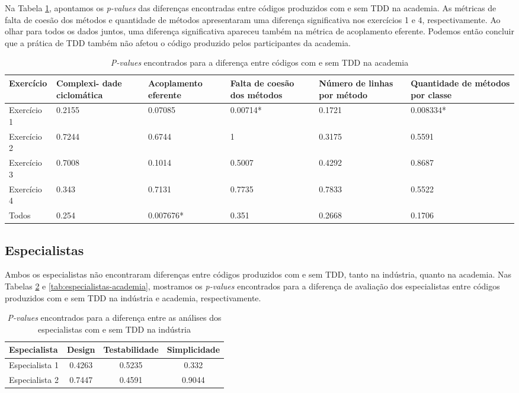 Na Tabela \ref{metricas-academia}, apontamos os \textit{p-values} das diferenças encontradas
entre códigos produzidos com e sem TDD na academia. As métricas de 
falta de coesão dos métodos e quantidade de métodos apresentaram
uma diferença significativa nos exercícios 1 e 4, respectivamente.
Ao olhar para todos os dados juntos, uma diferença significativa
apareceu também na métrica de acoplamento eferente.
Podemos então concluir que a prática de TDD também não afetou
o código produzido pelos participantes da academia.

\begin{table}
	\begin{tabular}{ | p{3cm} | p{2cm} | p{2cm} | p{2cm} | p{2cm} | p{2cm} |}
		\hline
		Exercício & Complexi- dade ciclomática & Acoplamento eferente & Falta de coesão dos métodos & Número de linhas por método 
		& Quantidade de métodos por classe \\
		\hline
			Exercício 1	& 0.2155	&	0.07085	& 0.00714* &	0.1721	& 0.008334*\\
			Exercício 2	& 0.7244	&	0.6744	& 1 &	0.3175 &	0.5591\\
			Exercício 3	& 0.7008	&	0.1014 &	0.5007	& 0.4292	& 0.8687\\
			Exercício 4	& 0.343	&	0.7131 &	0.7735	& 0.7833	& 0.5522\\
		\hline
			Todos &	0.254	&	0.007676* & 0.351 & 0.2668 & 0.1706\\
		\hline
	\end{tabular}
	\caption{\textit{P-values} encontrados para a diferença entre códigos com e sem TDD na academia}
	\label{metricas-academia}
\end{table}

\subsection{Especialistas}

Ambos os especialistas não encontraram diferenças entre códigos produzidos
com e sem TDD, tanto na indústria, quanto na academia. Nas Tabelas 
\ref{tab:especialistas-industria} e \ref{tab:especialistas-academia},
mostramos os \textit{p-values} encontrados para a diferença de avaliação dos especialistas
entre códigos produzidos com e sem TDD na indústria e academia, respectivamente.


\begin{table}[h!]
	\begin{tabular}{| p{5cm} | c | c | c | }
		\hline
		Especialista & Design & Testabilidade & Simplicidade\\
		\hline
		Especialista 1 &	0.4263 &	0.5235 &	0.332\\
		Especialista 2 &	0.7447 &	0.4591 &	0.9044\\
		\hline
	\end{tabular}
	\caption{\textit{P-values} encontrados para a diferença entre as análises dos especialistas com e sem TDD na indústria}
	\label{tab:especialistas-industria}
\end{table}


